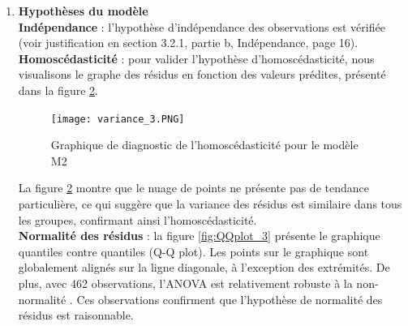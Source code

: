 \documentclass[12pt,a4paper]{article}
\begin{document}
\begin{enumerate}[label=\textbf{\alph*})]
\textit{\textbf{\underline{Représentation graphique des interactions}}}\\

La figure \ref{fig:interactions_2} montre les graphes des interactions entre les facteurs genre et catégorie IPS.
\begin{figure}[h!]
	\centering
	\texttt{[image: Interaction\_2.PNG]}
	\caption{Interactions entre les facteurs Genre et Catégorie IPS}
	\label{fig:interactions_2}
\end{figure}
On remarque que les profils ne sont pas exactement parallèles mais quasiment. La moyenne de \texttt{ecart\_MVPA} des filles ou des garçons ne diffère pas trop selon la catégorie IPS, et vice versa. Donc, ces graphiques suggèrent une très légère interaction entre le genre et la catégorie IPS.\\

Avant d'examiner les résultats, nous devons nous assurer que les conditions d'application du modèle sont respectées.\\

	
\item \textbf{Hypothèses du modèle} \\

\noindent
\textbf{Indépendance} : l'hypothèse d'indépendance des observations est vérifiée (voir justification en section 3.2.1, partie b, Indépendance, page 16).\\

\noindent
\textbf{Homoscédasticité} : pour valider l'hypothèse d'homoscédasticité, nous visualisons le graphe des résidus en fonction des valeurs prédites, présenté dans la figure \ref{fig:variance2}.
\begin{figure}[H]
	\centering
	\texttt{[image: variance\_3.PNG]}
	\caption{Graphique de diagnostic de l'homoscédasticité pour le modèle M2}
	\label{fig:variance2}
\end{figure}
La figure \ref{fig:variance2} montre que le nuage de points ne présente pas de tendance particulière, ce qui suggère que la variance des résidus est similaire dans tous les groupes, confirmant ainsi l'homoscédasticité.\\

\noindent
\textbf{Normalité des résidus} : la figure \ref{fig:QQplot_3} présente le graphique quantiles contre quantiles (Q-Q plot). Les points sur le graphique sont globalement alignés sur la ligne diagonale, à l'exception des extrémités. De plus, avec 462 observations, l'ANOVA est relativement robuste à la non-normalité \cite{poulin2023}. Ces observations confirment que l'hypothèse de normalité des résidus est raisonnable.


\end{enumerate}
\end{document}
